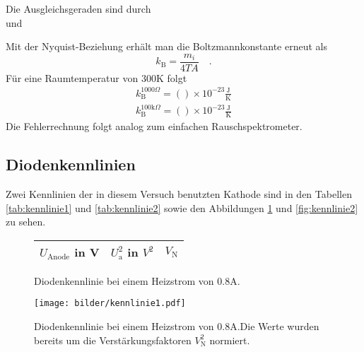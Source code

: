 		Die Ausgleichsgeraden sind durch
		\begin{equation}
			
		\end{equation}
		und
		\begin{equation}
			
		\end{equation}

		Mit der Nyquist-Beziehung erhält man die Boltzmannkonstante erneut als
		\begin{equation}
		k_\text{B}=\frac{m_i}{4 T A} \quad .
		\end{equation}
 		Für eine Raumtemperatur von $300$K folgt
		\begin{align}
		k_\text{B}^{1000\Omega}			=  () \times 10^{-23}\frac{\text{J}}
																			{\text{K}} \\
		k_\text{B}^{100\text{k}\Omega}	=  () \times 10^{-23}\frac{\text{J}}
																			{\text{K}}
		\end{align}
		Die Fehlerrechnung folgt analog zum einfachen Rauschspektrometer.



\clearpage
\subsection{Diodenkennlinien}
	Zwei Kennlinien der in diesem Versuch benutzten Kathode sind in
	den Tabellen \ref{tab:kennlinie1} und \ref{tab:kennlinie2} sowie
	den Abbildungen \ref{fig:kennlinie1} und \ref{fig:kennlinie2} zu
	sehen.

	\begin{figure}[htbp]
	\begin{minipage}{0.4\textwidth}
			\centering
			\begin{tabular}{ccc}
				\toprule \midrule
				$U_\text{Anode}$ in V & $U_\text{a}^2$ in $V^2$
				& $V_\text{N}$\\
				\midrule
				
				\midrule \bottomrule
			\end{tabular}
			\caption{Diodenkennlinie bei einem Heizstrom von
			$0.8$A.}
			\label{tab:kennlinie1}
	\end{minipage}
	\hfill
	\begin{minipage}{0.6\textwidth}
			\centering
			\texttt{[image: bilder/kennlinie1.pdf]}
			\caption{Diodenkennlinie bei einem Heizstrom von
			$0.8$A.Die Werte wurden bereits um die
            Verstärkungsfaktoren $V_\text{N}^2$ normiert. }
			\label{fig:kennlinie1}
	\end{minipage}
	\end{figure}


